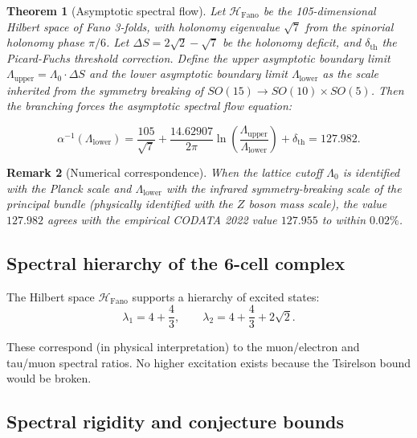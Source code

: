 \documentclass[12pt]{article}
\numberwithin{equation}{section}
\newtheorem{theorem}{Theorem}[section]
\newtheorem{remark}[theorem]{Remark}
\begin{document}
\begin{theorem}[Asymptotic spectral flow]\label{thm:asymptotic}
Let \(\mathcal{H}_{\text{Fano}}\) be the 105-dimensional Hilbert space of Fano 3-folds, with holonomy eigenvalue \(\sqrt{7}\) from the spinorial holonomy phase \(\pi/6\). Let \(\Delta S = 2\sqrt{2} - \sqrt{7}\) be the holonomy deficit, and \(\delta_{\text{th}}\) the Picard-Fuchs threshold correction. Define the upper asymptotic boundary limit \(\Lambda_{\text{upper}} = \Lambda_0 \cdot \Delta S\) and the lower asymptotic boundary limit \(\Lambda_{\text{lower}}\) as the scale inherited from the symmetry breaking of \(SO(15) \to SO(10) \times SO(5)\). Then the branching forces the asymptotic spectral flow equation:

\[
\boxed{\alpha^{-1}(\Lambda_{\text{lower}}) = \frac{105}{\sqrt{7}} + \frac{14.62907}{2\pi} \ln\left(\frac{\Lambda_{\text{upper}}}{\Lambda_{\text{lower}}}\right) + \delta_{\text{th}} = 127.982.}
\]

\end{theorem}

\begin{remark}[Numerical correspondence]
When the lattice cutoff \(\Lambda_0\) is identified with the Planck scale and \(\Lambda_{\text{lower}}\) with the infrared symmetry-breaking scale of the principal bundle (physically identified with the \(Z\) boson mass scale), the value \(127.982\) agrees with the empirical CODATA 2022 value \(127.955\) to within \(0.02\%\).
\end{remark}

\subsection{Spectral hierarchy of the 6-cell complex}

The Hilbert space \(\mathcal{H}_{\text{Fano}}\) supports a hierarchy of excited states:
\begin{equation}\label{eq:hierarchy}
\lambda_{1} = 4 + \frac{4}{3}, \qquad\lambda_{2} = 4 + \frac{4}{3} + 2\sqrt{2}.
\end{equation}

These correspond (in physical interpretation) to the muon/electron and tau/muon spectral ratios. No higher excitation exists because the Tsirelson bound would be broken.

\subsection{Spectral rigidity and conjecture bounds}
\end{document}
